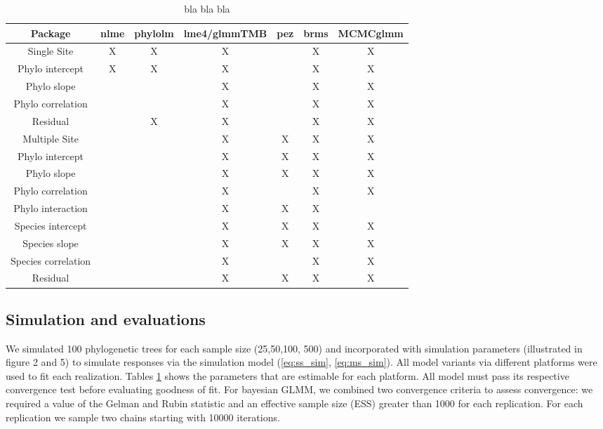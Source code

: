 \documentclass[12pt]{article}
\begin{document}

\begin{table}
\begin{tabularx}{\textwidth}{|c||c|c|c|c|c|c|}
\hline
Package	& \small{nlme}	& \small{phylolm}	& \small{lme4/glmmTMB} & \small{pez} & \small{brms} & \small{MCMCglmm} \\
\hline
\hline
Single Site & X & X & X & & X & X \\
\hline
Phylo intercept & X & X & X &  & X & X \\
Phylo slope &  &  & X &  & X & X \\
Phylo correlation &  &  & X &  & X & X \\
Residual & & X & X &  & X & X \\
\hline
\hline
Multiple Site &  &  & X & X & X & X \\
\hline
Phylo intercept &  &  & X & X & X & X \\
Phylo slope &  &  & X & X & X & X \\
Phylo correlation &  &  & X &  & X & X \\
Phylo interaction & &  & X & X & X &  \\
Species intercept & &  & X & X & X & X \\
Species slope & & & X & X & X & X \\
Species correlation & &  & X &  & X & X \\
Residual & &  & X & X & X & X \\
\hline
\end{tabularx}
\caption{bla bla bla \label{model_variant}}
\end{table}

\subsection{Simulation and evaluations}
We simulated 100 phylogenetic trees for each sample size (25,50,100, 500) and incorporated with simulation parameters (illustrated in figure 2 and 5) to simulate responses via the simulation model (\ref{eq:ss_sim}, \ref{eq:ms_sim}).
All model variants via different platforms were used to fit each realization.
Tables \ref{model_variant} shows the parameters that are estimable for each platform. 
All model must pass its respective convergence test before evaluating goodness of fit. 
For bayesian GLMM, we combined two convergence criteria to assess convergence: we required a value of the
Gelman and Rubin statistic and an effective sample size (ESS) greater than 1000 for each replication. 
For each replication we sample two chains starting with 10000 iterations. 
\end{document}
